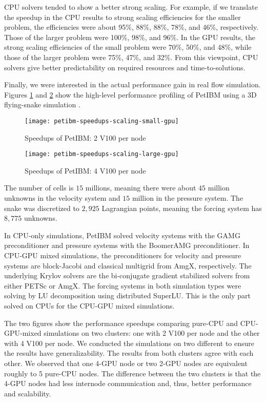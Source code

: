 CPU solvers tended to show a better strong scaling.
For example, if we translate the speedup in the CPU results to strong scaling efficiencies for the smaller problem, the efficiencies were about 95\%, 88\%, 88\%, 78\%, and 46\%, respectively.
Those of the larger problem were 100\%, 98\%, and 96\%.
In the GPU results, the strong scaling efficiencies of the small problem were 70\%, 50\%, and 48\%, while those of the larger problem were 75\%, 47\%, and 32\%.
From this viewpoint, CPU solvers give better predictability on required resources and time-to-solutions. 

Finally, we were interested in the actual performance gain in real flow simulation.
Figures \ref{fig:petibm-speedups-15M-small} and \ref{fig:petibm-speedups-15M-large} show the high-level performance profiling of PetIBM using a 3D flying-snake simulation \cite{krishnan_lift_2014,krishnan_cuibm_2017}.
\begin{figure}[hbt!]
    \texttt{[image: petibm-speedups-scaling-small-gpu]}
    \caption{Speedups of PetIBM: 2 V100 per node}
    \label{fig:petibm-speedups-15M-small}
\end{figure}
\begin{figure}[hbt!]
    \texttt{[image: petibm-speedups-scaling-large-gpu]}
    \caption{Speedups of PetIBM: 4 V100 per node}
    \label{fig:petibm-speedups-15M-large}
\end{figure}
The number of cells is $15$ millions, meaning there were about $45$ million unknowns in the velocity system and $15$ million in the pressure system.
The snake was discretized to $2,925$ Lagrangian points, meaning the forcing system has $8,775$ unknowns.

In CPU-only simulations, PetIBM solved velocity systems with the GAMG preconditioner and pressure systems with the BoomerAMG preconditioner.
In CPU-GPU mixed simulations, the preconditioners for velocity and pressure systems are block-Jacobi and classical multigrid from AmgX, respectively.
The underlying Krylov solvers are the bi-conjugate gradient stabilized solvers from either PETSc or AmgX.
The forcing systems in both simulation types were solving by LU decomposition using distributed SuperLU.
This is the only part solved on CPUs for the CPU-GPU mixed simulations.

The two figures show the performance speedups comparing pure-CPU and CPU-GPU-mixed simulations on two clusters: one with 2 V100 per node and the other with 4 V100 per node.
We conducted the simulations on two different to ensure the results have generalizability.
The results from both clusters agree with each other.
We observed that one 4-GPU node or two 2-GPU nodes are equivalent roughly to 5 pure-CPU nodes.
The difference between the two clusters is that the 4-GPU nodes had less internode communication and, thus, better performance and scalability.
